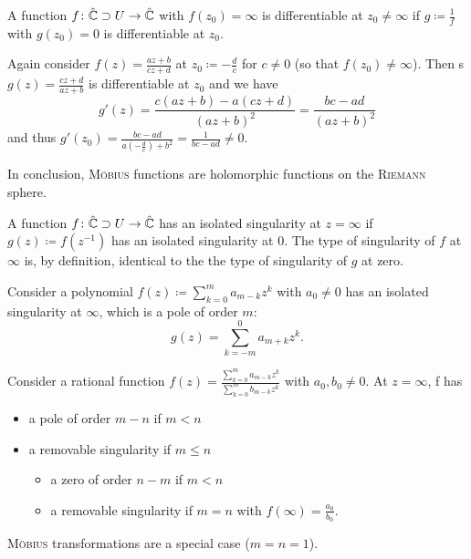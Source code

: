 \documentclass[a4paper,english]{article}
\begin{document}
\begin{defn}
    A function $f \colon \hat{\operatorname{\mathbb{C}}} \supset U \to \hat{\operatorname{\mathbb{C}}}$ with $f(z_0) = \infty$ is differentiable at $z_0 \ne \infty$ if $g \coloneqq \frac{1}{f}$ with $g(z_0) = 0$ is differentiable at $z_0$.
\end{defn}

\begin{example}
    Again consider $f(z) = \frac{a z + b}{c z + d}$ at $z_0 \coloneqq - \frac{d}{c}$ for $c \ne 0$ (so that $f(z_0) \ne \infty$).
    Then s $g(z) = \frac{c z + d}{a z + b}$ is differentiable at $z_0$ and we have
    \begin{equation*}
        g'(z)
        = \frac{c(a z + b) - a (c z + d)}{(a z + b)^2}
        = \frac{b c - a d}{(a z + b)^2}
    \end{equation*}
    and thus $g'(z_0) = \frac{b c -  a d}{a \left( - \frac{d}{c}\right) + b^2} = \frac{1}{b c - a d} \ne 0$.
\end{example}

In conclusion, \textsc{Möbius} functions are holomorphic functions on the \textsc{Riemann} sphere.

\begin{defn}
    A function $f \colon \hat{\operatorname{\mathbb{C}}} \supset U \to \hat{\operatorname{\mathbb{C}}}$ has an isolated singularity at $z = \infty$ if $g(z) \coloneqq f\left(z^{-1}\right)$ has an isolated singularity at $0$.
    The type of singularity of $f$ at $\infty$ is, by definition, identical to the the type of singularity of $g$ at zero.
\end{defn}

\begin{example}
    Consider a polynomial $f(z) \coloneqq \sum_{k = 0}^{m} a_{m - k} z^k$ with $a_0 \ne 0$ has an isolated singularity at $\infty$, which is a pole of order $m$:
    \begin{equation*}
        g(z)
        = \sum_{k = - m}^{0} a_{m + k} z^k.
    \end{equation*}
    
    Consider a rational function $f(z) = \frac{\sum_{k = 0}^{m} a_{m - k} z^k}{\sum_{k = 0}^{m} b_{m - k} z^k}$ with $a_0, b_0 \ne 0$.
    At $z = \infty$, f has
    \begin{itemize}
        \item 
        a pole of order $m - n$ if $m < n$
        
        \item
        a removable singularity if $m \le n$
        \begin{itemize}
            \item 
            a zero of order $n - m$ if $m < n$
            
            \item
            a removable singularity if $m = n$ with $f(\infty) = \frac{a_0}{b_0}$.
        \end{itemize}
    \end{itemize}
    \textsc{Möbius} transformations are a special case ($m = n = 1$).
\end{example}
\end{document}
